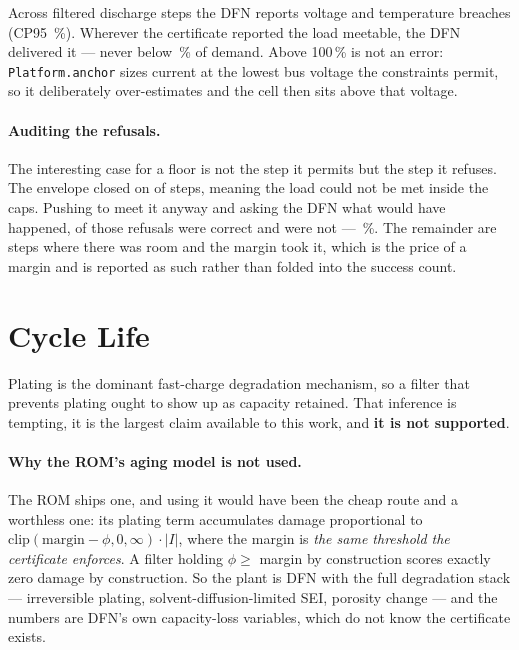 \documentclass[11pt,letterpaper]{article}
\theoremstyle{definition}
\theoremstyle{remark}
\begin{document}
Across \dcSteps{} filtered discharge steps the DFN reports \dcBreachV{} voltage and \dcBreachT{}
temperature breaches (CP95 \dcCP\,\%). Wherever the certificate reported the load meetable, the
DFN delivered it --- never below \dcServed\,\% of demand. Above 100\,\% is not an error:
\texttt{Platform.anchor} sizes current at the lowest bus voltage the constraints permit, so it
deliberately over-estimates and the cell then sits above that voltage.

\paragraph{Auditing the refusals.} The interesting case for a floor is not the step it
permits but the step it refuses. The envelope closed on \dcRefused{} of \dcSteps{} steps, meaning
the load could not be met inside the caps. Pushing to meet it anyway and asking the DFN what
would have happened, \dcRight{} of those refusals were correct and \dcWrong{} were not ---
\dcPrecision\,\%. The remainder are steps where there was room and the margin took it, which is
the price of a margin and is reported as such rather than folded into the success count.


\section{Cycle Life}\label{sec:cyclelife}

Plating is the dominant fast-charge degradation mechanism, so a filter that prevents plating
ought to show up as capacity retained. That inference is tempting, it is the largest claim
available to this work, and \textbf{it is not supported}.

\paragraph{Why the ROM's aging model is not used.} The ROM ships one, and using it would have been the
cheap route and a worthless one: its plating term accumulates damage proportional to
$\mathrm{clip}(\text{margin} - \phi, 0, \infty)\cdot|I|$, where the margin is \emph{the same
threshold the certificate enforces}. A filter holding $\phi \ge$ margin by construction scores
exactly zero damage by construction. So the plant is DFN with the full degradation stack ---
irreversible plating, solvent-diffusion-limited SEI, porosity change --- and the numbers are
DFN's own capacity-loss variables, which do not know the certificate exists.
\end{document}
